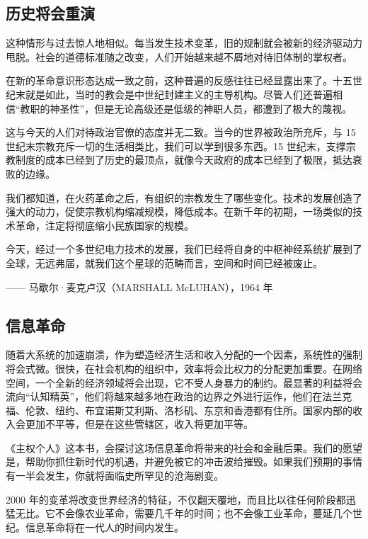 \subsection{历史将会重演}
这种情形与过去惊人地相似。每当发生技术变革，旧的规制就会被新的经济驱动力甩脱。社会的道德标准随之改变，人们开始越来越不屑地对待旧体制的掌权者。


在新的革命意识形态达成一致之前，这种普遍的反感往往已经显露出来了。十五世纪末就是如此，当时的教会是中世纪封建主义的主导机构。尽管人们还普遍相信“教职的神圣性”，但是无论高级还是低级的神职人员，都遭到了极大的蔑视。

这与今天的人们对待政治官僚的态度并无二致。当今的世界被政治所充斥，与 15 世纪末宗教充斥一切的生活相类比，我们可以学到很多东西。15 世纪末，支撑宗教制度的成本已经到了历史的最顶点，就像今天政府的成本已经到了极限，抵达衰败的边缘。


我们都知道，在火药革命之后，有组织的宗教发生了哪些变化。技术的发展创造了强大的动力，促使宗教机构缩减规模，降低成本。在新千年的初期，一场类似的技术革命，注定将彻底缩小民族国家的规模。



\begin{tcolorbox}
\kaishu 今天，经过一个多世纪电力技术的发展，我们已经将自身的中枢神经系统扩展到了全球，无远弗届，就我们这个星球的范畴而言，空间和时间已经被废止。
\begin{flushright}
—— 马歇尔·麦克卢汉（MARSHALL McLUHAN），1964 年
\end{flushright}
\end{tcolorbox}

\subsection{信息革命}
随着大系统的加速崩溃，作为塑造经济生活和收入分配的一个因素，系统性的强制将会式微。很快，在社会机构的组织中，效率将会比权力的分配更加重要。在网络空间，一个全新的经济领域将会出现，它不受人身暴力的制约。最显著的利益将会流向“认知精英”，他们将越来越多地在政治的边界之外进行运作，他们在法兰克福、伦敦、纽约、布宜诺斯艾利斯、洛杉矶、东京和香港都有住所。国家内部的收入会更加不平等，但是在这些管辖区，收入将更加平等。

《主权个人》这本书，会探讨这场信息革命将带来的社会和金融后果。我们的愿望是，帮助你抓住新时代的机遇，并避免被它的冲击波给摧毁。如果我们预期的事情有一半会发生，你就将面临史所罕见的沧海剧变。

2000 年的变革将改变世界经济的特征，不仅翻天覆地，而且比以往任何阶段都迅猛无比。它不会像农业革命，需要几千年的时间；也不会像工业革命，蔓延几个世纪。信息革命将在一代人的时间内发生。

